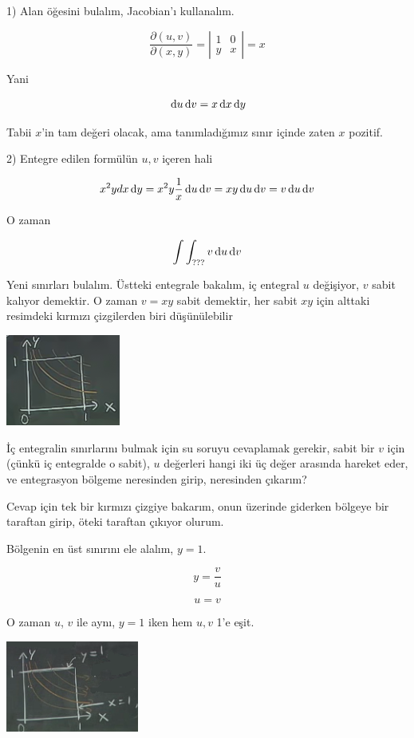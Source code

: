 \documentclass[12pt,fleqn]{article}\usepackage{../../common}
\begin{document}
1) Alan öğesini bulalım, Jacobian'ı kullanalım. 

$$ \frac{\partial (u,v)}{\partial(x,y)}  = 
\left|\begin{array}{rr}
1 & 0 \\
y & x
\end{array}\right| = 
x
$$

Yani

$$ \,\mathrm{d} u \,\mathrm{d} v = x \,\mathrm{d} x \,\mathrm{d} y $$

Tabii $x$'in tam değeri olacak, ama tanımladığımız sınır içinde zaten $x$
pozitif. 

2) Entegre edilen formülün $u,v$ içeren hali 

$$ x^2y dx \,\mathrm{d} y =  x^2y  \frac{1}{x} \,\mathrm{d} u \,\mathrm{d} v = 
xy \,\mathrm{d} u \,\mathrm{d} v = 
v  \,\mathrm{d} u \,\mathrm{d} v 
$$

O zaman 

$$ \int \int _{???} v \,\mathrm{d} u \,\mathrm{d} v $$

Yeni sınırları bulalım. Üstteki entegrale bakalım, iç entegral $u$
değişiyor, $v$ sabit kalıyor demektir. O zaman $v=xy$ sabit demektir, her
sabit $xy$ için alttaki resimdeki kırmızı çizgilerden biri düşünülebilir

\begin{center}
\includegraphics[height=3cm]{18_6.png}
\end{center}

İç entegralin sınırlarını bulmak için su soruyu cevaplamak gerekir, sabit bir
$v$ için (çünkü iç entegralde o sabit), $u$ değerleri hangi iki üç değer
arasında hareket eder, ve entegrasyon bölgeme neresinden girip, neresinden
çıkarım?

Cevap için tek bir kırmızı çizgiye bakarım, onun üzerinde giderken bölgeye
bir taraftan girip, öteki taraftan çıkıyor olurum. 

Bölgenin en üst sınırını ele alalım, $y=1$. 

$$ y = \frac{v}{u}  $$

$$ u = v $$

O zaman $u$, $v$ ile aynı, $y=1$ iken hem $u,v$ 1'e eşit.

\begin{center}
\includegraphics[height=3cm]{18_7.png}
\end{center}
\end{document}
